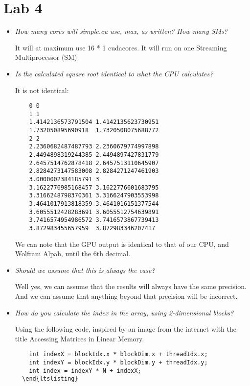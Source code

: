\documentclass[a4paper,12pt]{article}
\begin{document}
\section{Lab 4}


\begin{itemize}
\item \textit{How many cores will simple.cu use, max, as written? How many SMs?}

  It will at maximum use 16 * 1 cudacores. It will run on one Streaming Multiprocessor (SM).

\item \textit{Is the calculated square root identical to what the CPU calculates?}

  It is not identical:

  \begin{lstlisting}
    0 0
    1 1
    1.4142136573791504 1.4142135623730951
    1.732050895690918  1.7320508075688772
    2 2
    2.2360682487487793 2.2360679774997898
    2.4494898319244385 2.4494897427831779
    2.6457514762878418 2.6457513110645907
    2.8284273147583008 2.8284271247461903
    3.0000002384185791 3
    3.1622776985168457 3.1622776601683795
    3.3166248798370361 3.3166247903553998
    3.4641017913818359 3.4641016151377544
    3.6055512428283691 3.6055512754639891
    3.7416574954986572 3.7416573867739413
    3.872983455657959  3.872983346207417
  \end{lstlisting}

  We can note that the GPU output is identical to that of our CPU, and Wolfram Alpah, until the 6th decimal.

\item \textit{Should we assume that this is always the case?}

  Well yes, we can assume that the results will always have the same precision. And we can assume that anything beyond that precision will be incorrect.

\item \textit{How do you calculate the index in the array, using 2-dimensional blocks?}

  Using the following code, inspired by an image from the internet with the title Accessing Matrices in Linear Memory.

  \begin{lstlisting}
    int indexX = blockIdx.x * blockDim.x + threadIdx.x;
    int indexY = blockIdx.y * blockDim.y + threadIdx.y;
    int index = indexY * N + indexX;
  \end{ltslisting}



\end{lstlisting}
\end{itemize}
\end{document}
